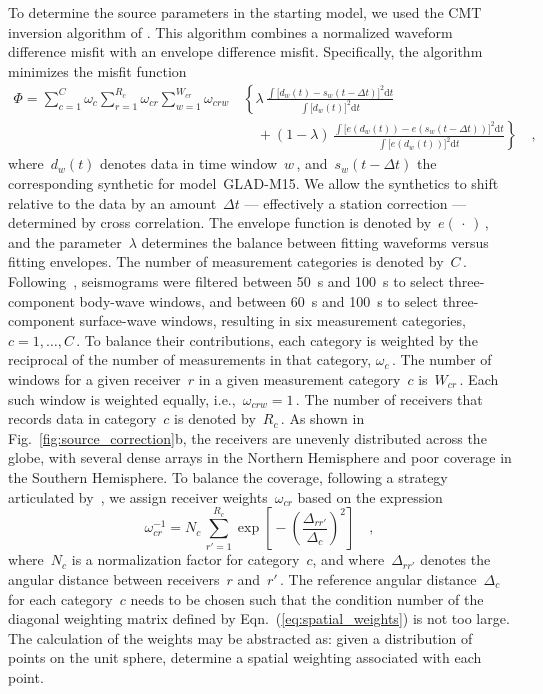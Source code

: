 \documentclass[extra,mreferee]{gji}
\begin{document}
To determine the source parameters in the starting model,
we used the CMT inversion algorithm of \cite{liu2004spectral}.
This algorithm combines a normalized waveform difference misfit with an envelope difference misfit.
Specifically, the algorithm minimizes the misfit function
\begin{equation}
   \begin{split}
      \Phi =  \sum\limits_{c=1}^{C} \omega_c \sum\limits_{r=1}^{R_c} \omega_{cr}
       \sum\limits_{w=1}^{W_{cr}} \omega_{crw}\,
          & \left\{ \lambda\, \frac
              { \int \big[ d_w(t) - s_w(t - \Delta t) \big]^2 \mathrm{d}t}
              {\int \big[ d_w(t) \big]^2  \mathrm{d}t} \right.
       \\ & \quad \left. \mbox{} + (1 - \lambda)\, \frac
              {\int \big[ e(d_w(t)) - e(s_w(t - \Delta t)) \big]^2 \mathrm{d}t}
              {\int \big[ e(d_w(t)) \big]^2\mathrm{d}t} \right\}
              \quad ,
   \end{split}
\end{equation}
where~$d_w(t)$ denotes data in time window~$w$\,,
and~$s_w(t - \Delta t)$ the corresponding synthetic for model~GLAD-M15.
We allow the synthetics to shift relative to the data by an amount~$\Delta t$
--- effectively a station correction --- determined by cross correlation.
The envelope function is denoted by~$e(\,\cdot\,)$\,,
and the parameter~$\lambda$ determines the balance between fitting waveforms versus fitting envelopes.
The number of measurement categories is denoted by~$C$\,.
Following~\cite{ekstrom2012global},
seismograms were filtered between 50~s and 100~s
to select three-component body-wave windows,
and between 60~s and 100~s to select three-component
surface-wave windows,
resulting in six measurement categories, $c=1,\ldots,C$\,.
To balance their contributions,
each category is weighted by the reciprocal of the number of measurements in that
category, $\omega_c$\,.
The number of windows for a given receiver~$r$ in a given measurement category~$c$ is~$W_{cr}$\,.
Each such window is weighted equally, i.e.,~$\omega_{crw}=1$\,.
The number of receivers that records data in category~$c$ is denoted by~$R_c$\,.
As shown in Fig.~\ref{fig:source_correction}b,
the receivers are unevenly distributed across the globe,
with several dense arrays in the Northern Hemisphere and poor coverage in the Southern Hemisphere.
To balance the coverage,
following a strategy articulated by~\cite{Ruanetal2018},
we assign receiver weights~$\omega_{cr}$ based on the expression
\begin{equation}
\omega_{cr}^{-1} = N_c\,\sum_{r'=1}^{R_c} \exp\left[\mbox{}-\left(\frac{\Delta_{rr'}}{\Delta_c}\right)^2\right]
\quad ,
\label{eq:spatial_weights}
\end{equation}
where~$N_c$ is a normalization factor for category~$c$,
and where~$\Delta_{rr'}$ denotes the angular distance between receivers~$r$ and~$r'$\,.
The reference angular distance~$\Delta_c$ for each category~$c$ needs to be chosen such that the condition 
number of the diagonal weighting matrix defined by Eqn.~(\ref{eq:spatial_weights}) is not too large.
The calculation of the weights may be abstracted as: given a distribution of
points on the unit sphere, determine a spatial weighting associated with each point.
\end{document}
